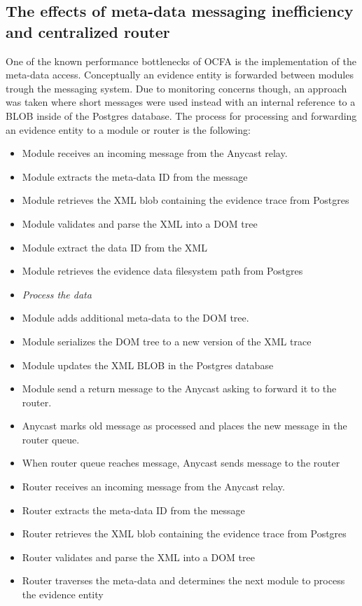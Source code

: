 \subsection{The effects of meta-data messaging inefficiency and centralized router}
One of the known performance bottlenecks of OCFA is the implementation of the meta-data access. Conceptually an evidence entity is forwarded between modules trough the messaging system. Due to monitoring concerns though, an approach was taken where short messages were used instead with an internal reference to a BLOB inside of the Postgres database. The process for processing and forwarding an evidence entity to a module or router is the following:
\begin{itemize}
\item Module receives an incoming message from the Anycast relay.
\item Module extracts the meta-data ID from the message
\item Module retrieves the XML blob containing the evidence trace from Postgres
\item Module validates and parse the XML into a DOM tree
\item Module extract the data ID from the XML
\item Module retrieves the evidence data filesystem path from Postgres
\item \emph{Process the data}
\item Module adds additional meta-data to the DOM tree.
\item Module serializes the DOM tree to a new version of the XML trace
\item Module updates the XML BLOB in the Postgres database
\item Module send a return message to the Anycast asking to forward it to the router.
\item Anycast marks old message as processed and places the new message in the router queue.
\item When router queue reaches message, Anycast sends message to the router
\item Router receives an incoming message from the Anycast relay.
\item Router extracts the meta-data ID from the message
\item Router retrieves the XML blob containing the evidence trace from Postgres
\item Router validates and parse the XML into a DOM tree
\item Router traverses the meta-data and determines the next module to process the evidence entity

\end{itemize}
